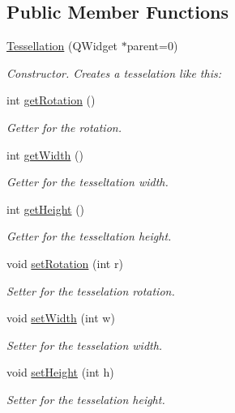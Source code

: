 \subsection*{Public Member Functions}
\begin{DoxyCompactItemize}
\item 
\hyperlink{class_tessellation_a3d77f5ad7aa19936ab47b43b7251526f}{Tessellation} (Q\+Widget $\ast$parent=0)
\begin{DoxyCompactList}\small\item\em Constructor. Creates a tesselation like this\+:  \end{DoxyCompactList}\item 
int \hyperlink{class_tessellation_a7d911890db50eb39146c1ec2d771a7dd}{get\+Rotation} ()
\begin{DoxyCompactList}\small\item\em Getter for the rotation. \end{DoxyCompactList}\item 
int \hyperlink{class_tessellation_a9280b338ed41af0ec33e81391e76f82a}{get\+Width} ()
\begin{DoxyCompactList}\small\item\em Getter for the tesseltation width. \end{DoxyCompactList}\item 
int \hyperlink{class_tessellation_a5fbfd2325a4ba0b7d4e66ce98e474c56}{get\+Height} ()
\begin{DoxyCompactList}\small\item\em Getter for the tesseltation height. \end{DoxyCompactList}\item 
void \hyperlink{class_tessellation_a4ee5bac93c53b25ff1d4ec8a43fdad64}{set\+Rotation} (int r)
\begin{DoxyCompactList}\small\item\em Setter for the tesselation rotation. \end{DoxyCompactList}\item 
void \hyperlink{class_tessellation_aa035a163e76a1616c58d20938b2853aa}{set\+Width} (int w)
\begin{DoxyCompactList}\small\item\em Setter for the tesselation width. \end{DoxyCompactList}\item 
void \hyperlink{class_tessellation_a57273ef613b239b6e16ea97085d2f4df}{set\+Height} (int h)
\begin{DoxyCompactList}\small\item\em Setter for the tesselation height. \end{DoxyCompactList}\end{DoxyCompactItemize}
